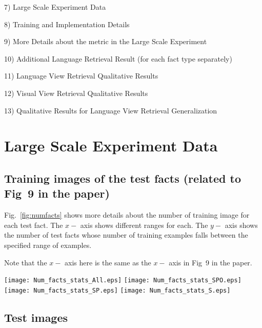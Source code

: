 \documentclass[runningheads]{llncs}
\begin{document}
7) Large Scale Experiment Data


8) Training and Implementation Details



9) More Details about the metric in the Large Scale Experiment


10) Additional Language Retrieval Result (for each fact type separately)

11) Language View Retrieval Qualitative Results


12) Visual View Retrieval Qualitative Results

13) Qualitative Results for Language View Retrieval Generalization

\section{Large Scale Experiment Data}
\label{app:lsc_data}


\subsection{Training images of the test facts (related to Fig~9 in the paper)}

Fig.~\ref{fig:numfacts} shows more details about the number of training image for each test fact. The $x-$ axis shows different ranges for each. The $y-$ axis shows the number of test facts whose number of training examples falls between the specified range of examples.

Note that the $x-$ axis here is the same as the $x-$ axis in Fig~9 in the paper.




\begin{figure*}[b!]
             \vspace{-3mm}
  \texttt{[image: Num\_facts\_stats\_All.eps]}
        \texttt{[image: Num\_facts\_stats\_SPO.eps]}
       \texttt{[image: Num\_facts\_stats\_SP.eps]}
             \texttt{[image: Num\_facts\_stats\_S.eps]}
             \vspace{-3mm}
        \caption{Number of Facts per each ``Number of Images Range''. $x-$axis shows ranges of number of images per fact. $y-$ axis is the number of facts whose number of images fall in the corresponding Range}
        \label{fig:numfacts}
\end{figure*}




\clearpage
\subsection{Test images}
\end{document}
